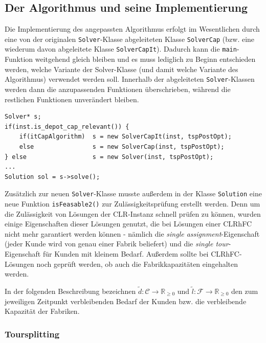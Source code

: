 \documentclass[a4paper,ngerman,11pt,bibtotoc]{scrartcl}
\theoremstyle{definition}
\theoremstyle{plain}
\theoremstyle{remark}
\newcommand{\IR}{\mathbb{R}}
\newcommand{\ClientSet}{\mathscr{C}}
\newcommand{\FacilitySet}{\mathscr{F}}
\newcommand{\CLR}{CLR}
\newcommand{\CLRHFC}{CLRhFC}
\begin{document}
	\subsection{Der Algorithmus und seine Implementierung}
	
	Die Implementierung des angepassten Algorithmus erfolgt im Wesentlichen durch eine von der originalen \lstinline|Solver|-Klasse abgeleiteten Klasse \lstinline|SolverCap| (bzw. eine wiederum davon abgeleitete Klasse \lstinline|SolverCapIt|). Dadurch kann die \lstinline|main|-Funktion weitgehend gleich bleiben und es muss lediglich zu Beginn entschieden werden, welche Variante der Solver-Klasse (und damit welche Variante des Algorithmus) verwendet werden soll. Innerhalb der abgeleiteten \lstinline|Solver|-Klassen werden dann die anzupassenden Funktionen überschrieben, während die restlichen Funktionen unverändert bleiben.
	
	\begin{lstlisting}[caption=Der weitere Ablauf des Programms kann unabhängig von der verwendeten Version des Solvers beschrieben werden]
Solver* s;
if(inst.is_depot_cap_relevant()) {
	if(itCapAlgorithm) 	s = new SolverCapIt(inst, tspPostOpt);
	else 				s = new SolverCap(inst, tspPostOpt);
} else 					s = new Solver(inst, tspPostOpt);
...
Solution sol = s->solve();
	\end{lstlisting}
	
	Zusätzlich zur neuen \lstinline|Solver|-Klasse musste außerdem in der Klasse \lstinline|Solution| eine neue Funktion  \lstinline|isFeasable2()| zur Zulässigkeitsprüfung erstellt werden. Denn um die Zulässigkeit von Lösungen der \CLR-Instanz schnell prüfen zu können, wurden einige Eigenschaften dieser Lösungen genutzt, die bei Lösungen einer \CLRHFC{} nicht mehr garantiert werden können - nämlich die \emph{single assignment}-Eigenschaft (jeder Kunde wird von genau einer Fabrik beliefert) und die \emph{single tour}-Eigenschaft für Kunden mit kleinem Bedarf. Außerdem sollte bei \CLRHFC-Lösungen noch geprüft werden, ob auch die Fabrikkapazitäten eingehalten werden.
	
	In der folgenden Beschreibung bezeichnen $\tilde{d}: \ClientSet \to \IR_{\geq 0}$ und $\tilde{l}: \FacilitySet \to \IR_{\geq 0}$ den zum jeweiligen Zeitpunkt verbleibenden Bedarf der Kunden bzw. die verbleibende Kapazität der Fabriken.
	

	\subsubsection{Toursplitting}
	
\end{document}

